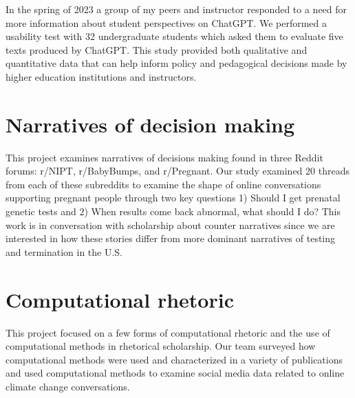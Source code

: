 \documentclass[
]{report}
\begin{document}
In the spring of 2023 a group of my peers and instructor responded to a
need for more information about student perspectives on ChatGPT. We
performed a usability test with 32 undergraduate students which asked
them to evaluate five texts produced by ChatGPT. This study provided
both qualitative and quantitative data that can help inform policy and
pedagogical decisions made by higher education institutions and
instructors.

\hypertarget{narratives-of-decision-making}{%
\section{Narratives of decision
making}\label{narratives-of-decision-making}}

This project examines narratives of decisions making found in three
Reddit forums: r/NIPT, r/BabyBumps, and r/Pregnant. Our study examined
20 threads from each of these subreddits to examine the shape of online
conversations supporting pregnant people through two key questions 1)
Should I get prenatal genetic tests and 2) When results come back
abnormal, what should I do? This work is in conversation with
scholarship about counter narratives since we are interested in how
these stories differ from more dominant narratives of testing and
termination in the U.S.

\hypertarget{computational-rhetoric}{%
\section{Computational rhetoric}\label{computational-rhetoric}}

This project focused on a few forms of computational rhetoric and the
use of computational methods in rhetorical scholarship. Our team
surveyed how computational methods were used and characterized in a
variety of publications and used computational methods to examine social
media data related to online climate change conversations.
\end{document}

